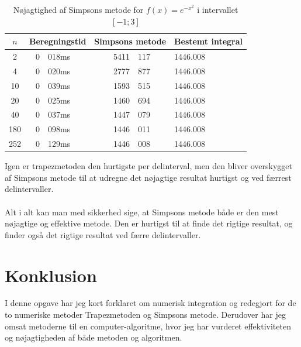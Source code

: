 \documentclass[12pt]{article}
\numberwithin{equation}{section}
\begin{document}
\begin{table}[H]
	\caption {Nøjagtighed af Simpsons metode for $f(x)=e^{-x^2}$ i intervallet $[-1;3]$} 
	\label{tab:simpsonsmetodeex2}
	\begin{center}
		\begin{tabular}{|c|r@{.}l|r @{.} l|l|}
			\hline $n$ & \multicolumn{2}{|c|}{Beregningstid} & \multicolumn{2}{|c|}{Simpsons metode} & Bestemt integral
			\\ 
			\hline 2 & 0&018ms & 5411&117 & 1446.008\\ 
			\hline 4 & 0&020ms & 2777&877 & 1446.008\\ 
			\hline 10 & 0&039ms & 1593&515 & 1446.008\\ 
			\hline 20 & 0&025ms & 1460&694 & 1446.008\\ 
			\hline 40 & 0&037ms & 1447&079 & 1446.008\\ 
			\hline 180 & 0&098ms & 1446&011 & 1446.008\\
			\hline 252 & 0&129ms & 1446&008 & 1446.008\\
			\hline 
		\end{tabular}
	\end{center}
\end{table}
Igen er trapezmetoden den hurtigste per delinterval, men den bliver overskygget af Simpsons metode til at udregne det nøjagtige resultat hurtigst og ved færrest delintervaller.
\\\\
Alt i alt kan man med sikkerhed sige, at Simpsons metode både er den mest nøjagtige og effektive metode. Den er hurtigst til at finde det rigtige resultat, og finder også det rigtige resultat ved færre delintervaller.

\section{Konklusion}
I denne opgave har jeg kort forklaret om numerisk integration og redegjort for de to numeriske metoder Trapezmetoden og Simpsons metode. Derudover har jeg omsat metoderne til en computer-algoritme, hvor jeg har vurderet effektiviteten og nøjagtigheden af både metoden og algoritmen.

\clearpage
\end{document}
